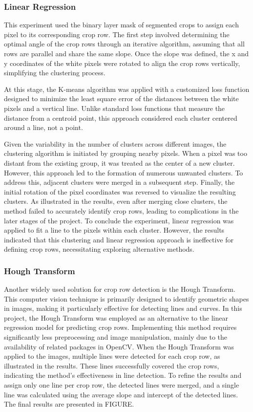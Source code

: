 \documentclass[conference]{IEEEtran}
\begin{document}
\subsubsection{Linear Regression}\label{Linear Regression}
This experiment used the binary layer mask of segmented crops to assign each pixel to its corresponding crop row. The first step involved determining the optimal angle of the crop rows through an iterative algorithm, assuming that all rows are parallel and share the same slope. Once the slope was defined, the x and y coordinates of the white pixels were rotated to align the crop rows vertically, simplifying the clustering process.

At this stage, the K-means algorithm was applied with a customized loss function designed to minimize the least square error of the distances between the white pixels and a vertical line. Unlike standard loss functions that measure the distance from a centroid point, this approach considered each cluster centered around a line, not a point.

Given the variability in the number of clusters across different images, the clustering algorithm is initiated by grouping nearby pixels. When a pixel was too distant from the existing group, it was treated as the center of a new cluster. However, this approach led to the formation of numerous unwanted clusters. To address this, adjacent clusters were merged in a subsequent step. Finally, the initial rotation of the pixel coordinates was reversed to visualize the resulting clusters. As illustrated in the results, even after merging close clusters, the method failed to accurately identify crop rows, leading to complications in the later stages of the project. To conclude the experiment, linear regression was applied to fit a line to the pixels within each cluster. However, the results indicated that this clustering and linear regression approach is ineffective for defining crop rows, necessitating exploring alternative methods.

\subsubsection{Hough Transform}\label{Hough Transform}
Another widely used solution for crop row detection is the Hough Transform. This computer vision technique is primarily designed to identify geometric shapes in images, making it particularly effective for detecting lines and curves. In this project, the Hough Transform was employed as an alternative to the linear regression model for predicting crop rows. Implementing this method requires significantly less preprocessing and image manipulation, mainly due to the availability of related packages in OpenCV. When the Hough Transform was applied to the images, multiple lines were detected for each crop row, as illustrated in the results. These lines successfully covered the crop rows, indicating the method's effectiveness in line detection. To refine the results and assign only one line per crop row, the detected lines were merged, and a single line was calculated using the average slope and intercept of the detected lines. The final results are presented in FIGURE.
\end{document}
